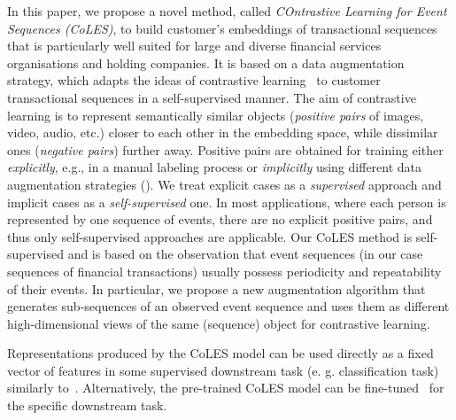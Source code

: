 \documentclass[sigconf]{acmart}
\begin{document}
In this paper, we propose a novel method, called \emph{COntrastive Learning for Event Sequences (CoLES)}, to build customer's embeddings of transactional sequences that is particularly well suited for large and diverse financial services organisations and holding companies. It is based on a data augmentation strategy, which adapts the ideas of contrastive learning~\citep{Xing2002DistanceML, Hadsell2006DimensionalityRB} to customer transactional sequences in a self-supervised manner.
The aim of contrastive learning is to represent semantically similar objects (\textit{positive pairs} of images, video, audio, etc.) closer to each other in the embedding space, while dissimilar ones (\textit{negative pairs}) further away. Positive pairs are obtained for training either {\it explicitly}, e.g., in a manual labeling process or {\it implicitly} using different data augmentation strategies (\cite{Falcon2020AFF}). We treat explicit cases as a {\it supervised} approach and implicit cases as a {\it self-supervised} one. In most applications, where each person is represented by one sequence of events, there are no explicit positive pairs, and thus only self-supervised approaches are applicable. Our CoLES method is self-supervised and is based on the observation that event sequences (in our case sequences of financial transactions) usually possess periodicity and repeatability of their events. In particular, we propose
a new augmentation algorithm that generates sub-sequences of an observed event sequence and uses them as different high-dimensional 
views of the same (sequence) object for contrastive learning.

Representations produced by the CoLES model can be used directly as a fixed vector of features in some supervised downstream task (e. g. classification task) similarly to~\citep{Mikolov2013EfficientEO, Song2017LearningUE, Zhai2019LearningAU}. Alternatively, the pre-trained CoLES model can be fine-tuned~\citep{Yosinski2014HowTA} for the specific downstream task.
\end{document}
